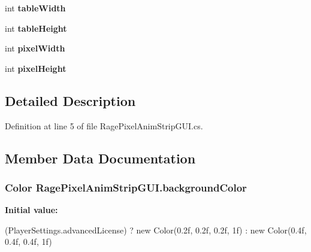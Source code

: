 \begin{DoxyCompactItemize}
\item 
\hypertarget{class_rage_pixel_anim_strip_g_u_i_aa32986e2ac209b1906969a1332074653}{int {\bfseries table\-Width}}\label{class_rage_pixel_anim_strip_g_u_i_aa32986e2ac209b1906969a1332074653}

\item 
\hypertarget{class_rage_pixel_anim_strip_g_u_i_afbb5786f7e35edbbeb2871174425f73e}{int {\bfseries table\-Height}}\label{class_rage_pixel_anim_strip_g_u_i_afbb5786f7e35edbbeb2871174425f73e}

\item 
\hypertarget{class_rage_pixel_anim_strip_g_u_i_a3372d9b2be5cdcb3ae9b1c30fbf6f669}{int {\bfseries pixel\-Width}}\label{class_rage_pixel_anim_strip_g_u_i_a3372d9b2be5cdcb3ae9b1c30fbf6f669}

\item 
\hypertarget{class_rage_pixel_anim_strip_g_u_i_acc4978a7d489c80c9864839184fcb457}{int {\bfseries pixel\-Height}}\label{class_rage_pixel_anim_strip_g_u_i_acc4978a7d489c80c9864839184fcb457}

\end{DoxyCompactItemize}


\subsection{Detailed Description}


Definition at line 5 of file Rage\-Pixel\-Anim\-Strip\-G\-U\-I.\-cs.



\subsection{Member Data Documentation}
\hypertarget{class_rage_pixel_anim_strip_g_u_i_a32855ec0e134a8626a339c54d4aa07b9}{
\subsubsection[{background\-Color}]{\setlength{\rightskip}{0pt plus 5cm}Color Rage\-Pixel\-Anim\-Strip\-G\-U\-I.\-background\-Color}}\label{class_rage_pixel_anim_strip_g_u_i_a32855ec0e134a8626a339c54d4aa07b9}
{\bfseries Initial value\-:}
\begin{DoxyCode}

        (PlayerSettings.advancedLicense) ?
        new Color(0.2f, 0.2f, 0.2f, 1f) :
        new Color(0.4f, 0.4f, 0.4f, 1f)
\end{DoxyCode}



